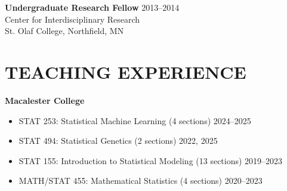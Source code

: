 \documentclass[margin]{res}
\begin{document}
\begin{resume}
\textbf{Undergraduate Research Fellow} \hfill 2013--2014 \\
Center for Interdisciplinary Research \\
St. Olaf College, Northfield, MN \\


\section{TEACHING EXPERIENCE}

\textbf{Macalester College}
\begin{itemize} 
\item STAT 253: Statistical Machine Learning (4 sections) \hfill 2024--2025 %
\item STAT 494: Statistical Genetics (2 sections) \hfill 2022, 2025 %
\item STAT 155: Introduction to Statistical Modeling (13 sections)  \hfill 2019--2023 %
\item MATH/STAT 455: Mathematical Statistics (4 sections) \hfill 2020--2023 \\ %
\end{itemize}



\end{resume}
\end{document}
